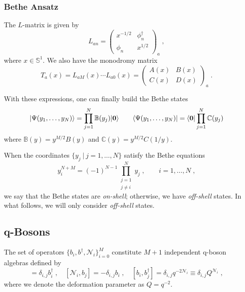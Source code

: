 \documentclass[a4paper,11pt]{amsart}
\begin{document}
\subsubsection{Bethe Ansatz}
The \(L\)-matrix is given by 
\begin{equation}
  L_{an} = 
\begin{pmatrix}
x^{ - 1/2} & \phi_n^\dagger \\ \phi_n & x^{1/2}
\end{pmatrix}_a\; , 
\end{equation}
where \(x \in \mathbb{S}^1\). We also have the monodromy matrix
\begin{equation}
  T_a(x) = L_{aM}(x) \cdots L_{a0}(x) = 
\begin{pmatrix}
A(x) & B(x) \\ C(x) & D(x)
\end{pmatrix}_a\; .
\end{equation}

With these expressions, one can finally build the Bethe states
\begin{equation}
  \lvert\Psi(y_1, \dots, y_N)\rangle = \prod_{j=1}^N \mathbb{B}(y_j) \lvert\bm{0}\rangle \qquad 
  \langle\Psi(y_1, \dots, y_N)\rvert = \langle\bm{0}\rvert\prod_{j=1}^N \mathbb{C}(y_j) 
\end{equation}
where \(\mathbb{B}(y) = y^{M/2} B(y)\) and \(\mathbb{C}(y) = y^{M/2} C(1/y)\).

When the coordinates \(\{ y_j \ | \ j =1, \dots , N\}\) satisfy the Bethe equations
\begin{equation}
\label{eq:bethe_eq}
  y^{N + M}_i = (-1)^{N-1} \prod_{\substack{j = 1 \\ j \neq i}}^N y_j\; , \qquad i = 1, \dots, N\; , 
\end{equation}
we say that the Bethe states are \emph{on-shell}; otherwise, we have
\emph{off-shell} states. In what follows, we will only consider
\emph{off-shell} states.


\subsection{q-Bosons}
The set of operators \(\{b_i, b^\dagger,\mathcal{N}_i\}_{i=0}^M\) constitute
\(M+1\) independent q-boson algebras defined by
\begin{equation}
[\mathcal{N}_i, b_j^\dagger]=\delta_{i,j} b_i^\dagger\; , \quad 
[\mathcal{N}_i, b_j]=-\delta_{i,j}b_i\; , \quad
[b_i, b_j^\dagger]= \delta_{i,j} q^{-2\mathcal{N}_i}  \equiv \delta_{i,j} Q^{\mathcal{N}_i}\; , 
\end{equation}
where we denote the deformation parameter as \(Q = q^{-2}\).
\end{document}
